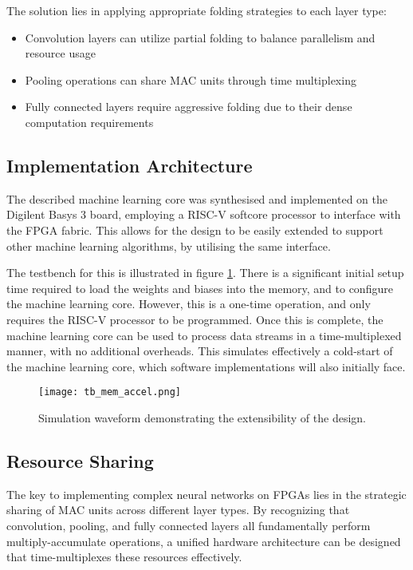 The solution lies in applying appropriate folding strategies to each layer type:
\begin{itemize}
    \item Convolution layers can utilize partial folding to balance parallelism and resource usage
    \item Pooling operations can share MAC units through time multiplexing
    \item Fully connected layers require aggressive folding due to their dense computation requirements
\end{itemize}

\subsection{Implementation Architecture}
The described machine learning core was synthesised and implemented on the Digilent Basys 3 board, employing a RISC-V softcore processor to interface with the FPGA fabric. This allows for the design to be easily extended to support other machine learning algorithms, by utilising the same interface.

The testbench for this is illustrated in figure \ref{fig:tb_extensibility}. There is a significant initial setup time required to load the weights and biases into the memory, and to configure the machine learning core. However, this is a one-time operation, and only requires the RISC-V processor to be programmed. Once this is complete, the machine learning core can be used to process data streams in a time-multiplexed manner, with no additional overheads. This simulates effectively a cold-start of the machine learning core, which software implementations will also initially face.

\begin{figure}[h]
    \centering
    \texttt{[image: tb\_mem\_accel.png]}
    \caption{Simulation waveform demonstrating the extensibility of the design.}
    \label{fig:tb_extensibility}
\end{figure}

\subsection{Resource Sharing}
The key to implementing complex neural networks on FPGAs lies in the strategic sharing of MAC units across different layer types. By recognizing that convolution, pooling, and fully connected layers all fundamentally perform multiply-accumulate operations, a unified hardware architecture can be designed that time-multiplexes these resources effectively.

